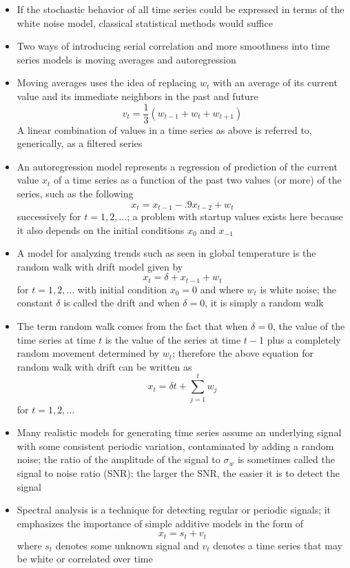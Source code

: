 \documentclass[12pt]{article}
\begin{document}
\begin{itemize}
\item If the stochastic behavior of all time series could be expressed in terms of the white noise model, classical statistical methods would suffice
\item Two ways of introducing serial correlation and more smoothness into time series models is moving averages and autoregression
\item Moving averages uses the idea of replacing $w_t$ with an average of its current value and its immediate neighbors in the past and future $$ v_t = \frac{1}{3}(w_{t-1} + w_t + w_{t+1}) $$ A linear combination of values in a time series as above is referred to, generically, as a filtered series
\item An autoregression model represents a regression of prediction of the current value $x_t$ of a time series as a function of the past two values (or more) of the series, such as the following
$$ x_t = x_{t-1} - .9x_{t-2} + w_t $$ successively for $t=1,2,\dots$; a problem with startup values exists here because it also depends on the initial conditions $x_0$ and $x_{-1}$
\item A model for analyzing trends such as seen in global temperature is the random walk with drift model given by $$ x_t = \delta + x_{t-1} + w_t $$ for $t=1,2,\dots$ with initial condition $x_0 = 0$ and where $w_t$ is white noise; the constant $\delta$ is called the drift and when $\delta = 0$, it is simply a random walk
\item The term random walk comes from the fact that when $\delta = 0$, the value of the time series at time $t$ is the value of the series at time $t-1$ plus a completely random movement determined by $w_t$; therefore the above equation for random walk with drift can be written as $$x_t = \delta t + \sum_{j=1}^t w_j$$ for $t=1,2,\dots$
\item Many realistic models for generating time series assume an underlying signal with some consistent periodic variation, contaminated by adding a random noise; the ratio of the amplitude of the signal to $\sigma_w$ is sometimes called the signal to noise ratio (SNR); the larger the SNR, the easier it is to detect the signal
\item Spectral analysis is a technique for detecting regular or periodic signals; it emphasizes the importance of simple additive models in the form of $$x_t = s_t + v_t$$ where $s_t$ denotes some unknown signal and $v_t$ denotes a time series that may be white or correlated over time 
\end{itemize}
\end{document}
